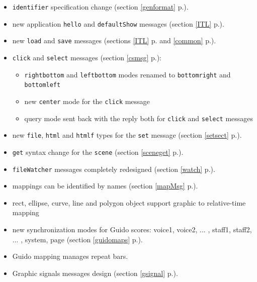 \documentclass[a4paper,twoside]{report}
\newcommand{\fullref}[1]	{\ref{#1} p.\pageref{#1}}
\newcommand{\OSC}[1]		{\texttt{#1}}
\begin{document}
\begin{itemize}
\item \OSC{identifier} specification change (section \fullref{genformat}).
\item new application \OSC{hello} and  \OSC{defaultShow} messages (section \fullref{ITL}).
\item new \OSC{load} and \OSC{save} messages  (sections \fullref{ITL} and  \fullref{common}).
\item \OSC{click} and \OSC{select} messages (section \fullref{csmsg}):
\begin{itemize}
\item \OSC{rightbottom} and \OSC{leftbottom} modes renamed to \OSC{bottomright} and \OSC{bottomleft}
\item new \OSC{center} mode for the \OSC{click} message
\item query mode sent back with the reply both for \OSC{click} and  \OSC{select} messages
\end{itemize}
\item new \OSC{file}, \OSC{html} and  \OSC{htmlf} types for the \OSC{set} message (section \fullref{setsect}).
\item \OSC{get} syntax change for the \OSC{scene} (section \fullref{sceneget}).
\item \OSC{fileWatcher} messages completely redesigned (section \fullref{watch}).
\item mappings can be identified by names (section \fullref{mapMsg}).
\item rect, ellipse, curve, line and polygon object support graphic to relative-time mapping
\item new synchronization modes for Guido scores: voice1, voice2, ... , staff1, staff2, ... , system, page (section \fullref{guidomaps}).
\item Guido mapping manages repeat bars.
\item Graphic signals messages design (section \fullref{gsignal}).
\end{itemize}


\printindex
\end{document}
